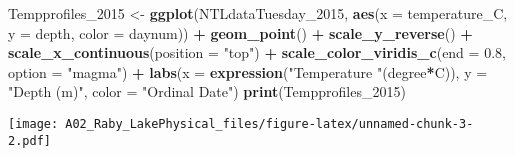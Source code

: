\documentclass[]{article}
\newenvironment{Shaded}{\begin{snugshade}}{\end{snugshade}}
\newcommand{\DataTypeTok}[1]{\textcolor[rgb]{0.13,0.29,0.53}{#1}}
\newcommand{\DecValTok}[1]{\textcolor[rgb]{0.00,0.00,0.81}{#1}}
\newcommand{\FloatTok}[1]{\textcolor[rgb]{0.00,0.00,0.81}{#1}}
\newcommand{\KeywordTok}[1]{\textcolor[rgb]{0.13,0.29,0.53}{\textbf{#1}}}
\newcommand{\NormalTok}[1]{#1}
\newcommand{\OperatorTok}[1]{\textcolor[rgb]{0.81,0.36,0.00}{\textbf{#1}}}
\newcommand{\StringTok}[1]{\textcolor[rgb]{0.31,0.60,0.02}{#1}}
\begin{document}
\begin{Shaded}
\begin{Highlighting}[]
\NormalTok{Tempprofiles_}\DecValTok{2015}\NormalTok{ <-}\StringTok{ }
\StringTok{  }\KeywordTok{ggplot}\NormalTok{(NTLdataTuesday_}\DecValTok{2015}\NormalTok{, }
         \KeywordTok{aes}\NormalTok{(}\DataTypeTok{x =}\NormalTok{ temperature_C, }\DataTypeTok{y =}\NormalTok{ depth, }\DataTypeTok{color =}\NormalTok{ daynum)) }\OperatorTok{+}
\StringTok{  }\KeywordTok{geom_point}\NormalTok{() }\OperatorTok{+}
\StringTok{  }\KeywordTok{scale_y_reverse}\NormalTok{() }\OperatorTok{+}
\StringTok{  }\KeywordTok{scale_x_continuous}\NormalTok{(}\DataTypeTok{position =} \StringTok{"top"}\NormalTok{) }\OperatorTok{+}
\StringTok{  }\KeywordTok{scale_color_viridis_c}\NormalTok{(}\DataTypeTok{end =} \FloatTok{0.8}\NormalTok{, }\DataTypeTok{option =} \StringTok{"magma"}\NormalTok{) }\OperatorTok{+}\StringTok{ }
\StringTok{  }\KeywordTok{labs}\NormalTok{(}\DataTypeTok{x =} \KeywordTok{expression}\NormalTok{(}\StringTok{"Temperature "}\NormalTok{(degree}\OperatorTok{*}\NormalTok{C)), }\DataTypeTok{y =} \StringTok{"Depth (m)"}\NormalTok{, }
       \DataTypeTok{color =} \StringTok{"Ordinal Date"}\NormalTok{)}
\KeywordTok{print}\NormalTok{(Tempprofiles_}\DecValTok{2015}\NormalTok{)}
\end{Highlighting}
\end{Shaded}

\texttt{[image: A02\_Raby\_LakePhysical\_files/figure-latex/unnamed-chunk-3-2.pdf]}
\end{document}
